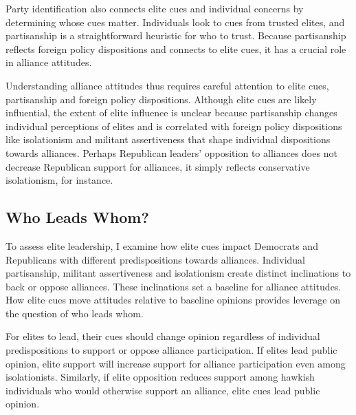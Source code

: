 \documentclass[12pt]{article}
\begin{document}
Party identification also connects elite cues and individual concerns by determining whose cues matter.
Individuals look to cues from trusted elites, and partisanship is a straightforward heuristic for who to trust. 
Because partisanship reflects foreign policy dispositions and connects to elite cues, it has a crucial role in alliance attitudes. 


Understanding alliance attitudes thus requires careful attention to elite cues, partisanship and foreign policy dispositions. 
Although elite cues are likely influential, the extent of elite influence is unclear because partisanship changes individual perceptions of elites and is correlated with foreign policy dispositions like isolationism and militant assertiveness that shape individual dispositions towards alliances. 
Perhaps Republican leaders' opposition to alliances does not decrease Republican support for alliances, it simply reflects conservative isolationism, for instance. 




\subsection{Who Leads Whom?}


To assess elite leadership, I examine how elite cues impact Democrats and Republicans with different predispositions towards alliances.
Individual partisanship, militant assertiveness and isolationism create distinct inclinations to back or oppose alliances. 
These inclinations set a baseline for alliance attitudes. 
How elite cues move attitudes relative to baseline opinions provides leverage on the question of who leads whom. 


For elites to lead, their cues should change opinion regardless of individual predispositions to support or oppose alliance participation. 
If elites lead public opinion, elite support will increase support for alliance participation even among isolationists. 
Similarly, if elite opposition reduces support among hawkish individuals who would otherwise support an alliance, elite cues lead public opinion. 
\end{document}
